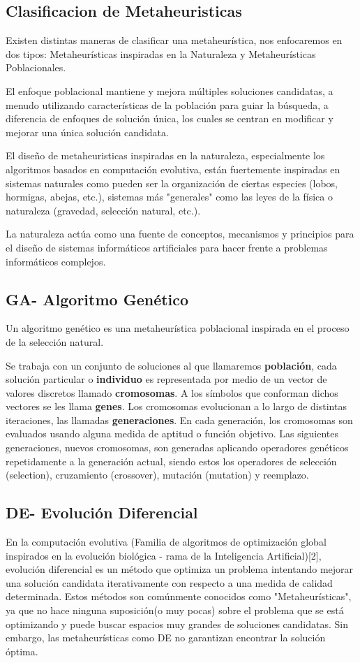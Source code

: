 \documentclass[10pt]{article}
\begin{document}
\subsection*{Clasificacion de Metaheuristicas}
Existen distintas maneras de clasificar una metaheurística, nos enfocaremos en dos tipos: Metaheurísticas inspiradas en la Naturaleza y Metaheurísticas Poblacionales.

El enfoque poblacional mantiene y mejora múltiples soluciones candidatas, a menudo utilizando características de la población para guiar la búsqueda, a diferencia de enfoques de solución única, los cuales se centran en modificar y mejorar una única solución candidata.

El diseño de metaheuristicas inspiradas en la naturaleza, especialmente los algoritmos basados en computación evolutiva, están fuertemente inspiradas en sistemas naturales como pueden ser la organización de ciertas especies (lobos, hormigas, abejas, etc.), sistemas más "generales" como las leyes de la física o naturaleza (gravedad, selección natural, etc.). 

La naturaleza actúa como una fuente de conceptos, mecanismos y principios para el diseño de sistemas informáticos artificiales para hacer frente a problemas informáticos complejos.

\subsection{\textbf{GA}- Algoritmo Genético }

Un algoritmo genético es una metaheurística poblacional inspirada en el proceso de la selección natural.

Se trabaja con un conjunto de soluciones al que llamaremos \textbf{población}, cada solución particular o \textbf{individuo} es representada por medio de un vector de valores discretos llamado \textbf{cromosomas}. A los símbolos que conforman dichos vectores se les llama \textbf{genes}. Los cromosomas evolucionan a lo largo de distintas iteraciones, las llamadas \textbf{generaciones}. En cada generación, los cromosomas son evaluados usando alguna medida de aptitud o función objetivo. Las siguientes generaciones, nuevos cromosomas, son generadas aplicando operadores genéticos repetidamente a la generación actual, siendo estos los operadores de selección (selection), cruzamiento (crossover), mutación (mutation) y reemplazo.

\subsection{\textbf{DE}- Evolución Diferencial }
En la computación evolutiva (Familia de algoritmos de optimización global inspirados en la evolución biológica - rama de la Inteligencia Artificial)[2], evolución diferencial es un método que optimiza un problema intentando mejorar una solución candidata iterativamente con respecto a una medida de calidad determinada. Estos métodos son comúnmente conocidos como "Metaheurísticas", ya que no hace ninguna suposición(o muy pocas) sobre el problema que se está optimizando y puede buscar espacios muy grandes de soluciones candidatas. Sin embargo, las metaheurísticas como DE no garantizan encontrar la solución óptima.
\end{document}
